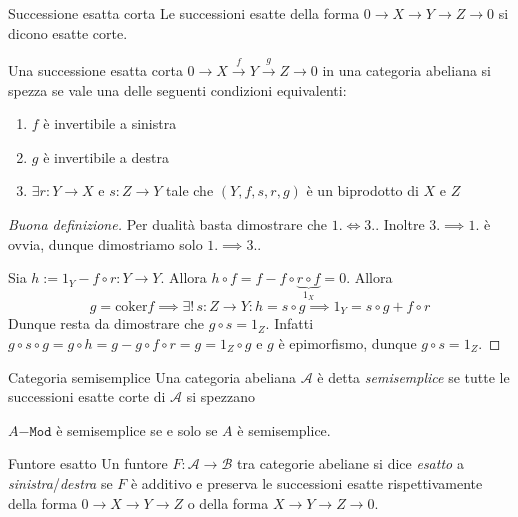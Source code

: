 \begin{definition}{Successione esatta corta}
    Le successioni esatte della forma \( 0 \to X \to Y \to Z \to 0\) si dicono
    esatte corte.
\end{definition}
\begin{proposition}{}
    Una successione esatta corta \(0 \to X \overset{f}{\to } Y \overset{g}{\to } Z \to 0\) in una
    categoria abeliana si spezza se vale una delle seguenti condizioni
    equivalenti:
\begin{enumerate}[label = \arabic*.]
    \item \(f\) è invertibile a sinistra 
    \item \(g\) è invertibile a destra
    \item \(\exists r : Y \to X\) e \(s : Z \to Y\) tale che \({(Y, f, s, r, g)}\) è un biprodotto di \(X \) e \(Z\) 
\end{enumerate}
\end{proposition}
\begin{proof}[Buona definizione]
    Per dualità basta dimostrare che \(1. \iff 3.\). Inoltre \(
    3. \implies 1.\) è ovvia, dunque dimostriamo solo \(1. \implies 3.\).

    Sia \(h:= 1_Y - f \circ r : Y \to Y\). Allora \(h \circ f = f - f \circ
    \underbrace{r \circ f}_{1_X} = 0\). Allora
    \[g = \mathrm{coker}f \implies \exists !\, s : Z \to Y : h = s \circ g
    \implies 1_Y = s \circ g + f \circ r \]
    Dunque resta da dimostrare che \(g \circ s = 1_Z\). Infatti \(g \circ s \circ g = g \circ h = g - g \circ f \circ r = g = 1_Z \circ g\) e \(g\) è epimorfismo, dunque \(g \circ s = 1_Z\).
\end{proof}

\begin{definition}{Categoria semisemplice}
    Una categoria abeliana \(\mathcal{A}\) è detta \emph{semisemplice} se tutte le
    successioni esatte corte di \(\mathcal{A}\) si spezzano 
\end{definition}

\begin{example}{}
    \(A\mathtt{-Mod}\) è semisemplice se e solo se \(A\) è semisemplice.
\end{example}

\begin{definition}{Funtore esatto}
    Un funtore \(F : \mathcal{A} \to \mathcal{B}\) tra categorie abeliane si
    dice \emph{esatto} a \emph{sinistra}/\emph{destra} se \(F\) è additivo e
    preserva le successioni esatte rispettivamente della forma \(0 \to X \to Y \to Z\) o della forma 
    \(X \to Y \to Z \to 0\).
\end{definition}

